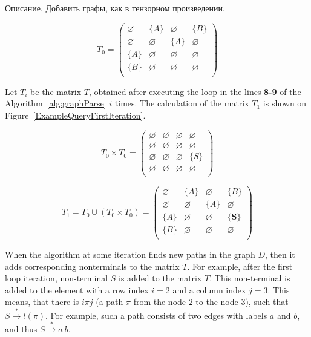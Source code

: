 \begin{example}

Описание. Добавить графы, как в тензорном произведении.


\[
T_0 = \begin{pmatrix}
    \varnothing & \{A\}       & \varnothing & \{B\}       \\
    \varnothing & \varnothing & \{A\}       & \varnothing \\
    \{A\}       & \varnothing & \varnothing & \varnothing \\
    \{B\}       & \varnothing & \varnothing & \varnothing \\
\end{pmatrix}
\]

Let $T_i$ be the matrix $T$, obtained after executing the loop in the lines \textbf{8-9} of the Algorithm~\ref{alg:graphParse} $i$ times. The calculation of the matrix $T_1$ is shown on Figure~\ref{ExampleQueryFirstIteration}.


\[
T_0 \times T_0 = \begin{pmatrix}
    \varnothing & \varnothing & \varnothing & \varnothing \\
    \varnothing & \varnothing & \varnothing & \varnothing \\
    \varnothing & \varnothing & \varnothing & \{S\}       \\
    \varnothing & \varnothing & \varnothing & \varnothing \\
\end{pmatrix}
\]

\[
T_1 = T_0 \cup (T_0 \times T_0) = \begin{pmatrix}
    \varnothing & \{A\}       & \varnothing & \{B\}       \\
    \varnothing & \varnothing & \{A\}       & \varnothing \\
    \{A\}       & \varnothing & \varnothing & \{\pmb{S}\}       \\
    \{B\}       & \varnothing & \varnothing & \varnothing \\
\end{pmatrix}
\]

When the algorithm at some iteration finds new paths in the graph $D$, then it adds corresponding nonterminals to the matrix $T$. For example, after the first loop iteration, non-terminal $S$ is added to the matrix $T$. This non-terminal is added to the element with a row index $i = 2$ and a column index $j = 3$. This means, that there is $i\pi j$ (a path $\pi$ from the node 2 to the node 3), such that $S \xrightarrow{*} l(\pi)$. For example, such a path consists of two edges with labels $a$ and $b$, and thus $S \xrightarrow{*} a \ b$.


\end{example}
